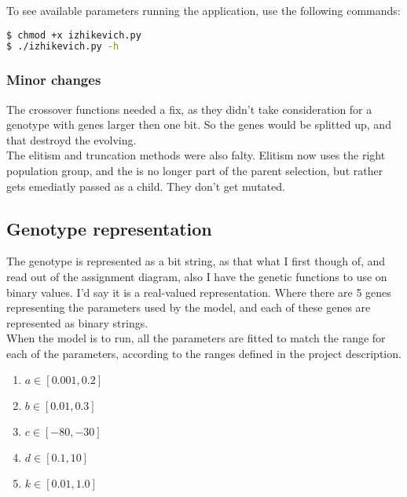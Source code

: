 To see available parameters running the application, use the following commands:

\begin{lstlisting}[frame=single,caption={Application usage},language=bash] 
$ chmod +x izhikevich.py
$ ./izhikevich.py -h
\end{lstlisting}

\subsubsection{Minor changes}
\label{sec:geneticchanges}

The crossover functions needed a fix, as they didn't take consideration for a genotype with genes larger
then one bit. So the genes would be splitted up, and that destroyd the evolving. \\

The elitism and truncation methods were also falty. Elitism now uses the right population group, and the
is no longer part of the parent selection, but rather gets emediatly passed as a child. They don't get mutated. 


\subsection{Genotype representation}
\label{sec:genotype}

The genotype is represented as a bit string, as that what I first though of, and read out of the assignment 
diagram, also I have the genetic functions to use on binary values. I'd say it is a real-valued representation. 
Where there are 5 genes representing the parameters used by the model, and each of these genes are 
represented as binary strings.  \\ 

When the model is to run, all the parameters are fitted to match the range for each of the parameters, according
to the ranges defined in the project description. 

\begin{enumerate}

	\item $a  \in  [0.001, 0.2] $
	\item $b  \in  [0.01, 0.3] $
	\item $c  \in  [-80, -30] $
	\item $d  \in  [0.1,10] $
	\item $k  \in  [0.01, 1.0] $

\end{enumerate}
 
